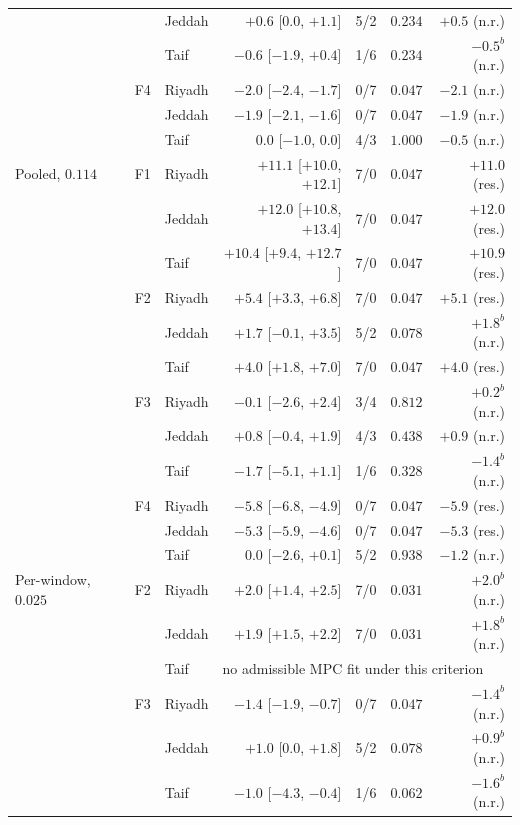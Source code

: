 \documentclass[11pt]{article}
\begin{document}
\begin{table}[!ht]
\begin{tabularx}{\textwidth}{@{}llXrrrr@{}}
 &  & Jeddah & $+0.6$ [$0.0$, $+1.1$] & 5/2 & $0.234$ & $+0.5$ (n.r.) \\
 &  & Taif & $-0.6$ [$-1.9$, $+0.4$] & 1/6 & $0.234$ & $-0.5^{b}$ (n.r.) \\
 & F4 & Riyadh & $-2.0$ [$-2.4$, $-1.7$] & 0/7 & $0.047$ & $-2.1$ (n.r.) \\
 &  & Jeddah & $-1.9$ [$-2.1$, $-1.6$] & 0/7 & $0.047$ & $-1.9$ (n.r.) \\
 &  & Taif & $0.0$ [$-1.0$, $0.0$] & 4/3 & $1.000$ & $-0.5$ (n.r.) \\
Pooled, $0.114$ & F1 & Riyadh & $+11.1$ [$+10.0$, $+12.1$] & 7/0 & $0.047$ & $+11.0$ (res.) \\
 &  & Jeddah & $+12.0$ [$+10.8$, $+13.4$] & 7/0 & $0.047$ & $+12.0$ (res.) \\
 &  & Taif & $+10.4$ [$+9.4$, $+12.7$] & 7/0 & $0.047$ & $+10.9$ (res.) \\
 & F2 & Riyadh & $+5.4$ [$+3.3$, $+6.8$] & 7/0 & $0.047$ & $+5.1$ (res.) \\
 &  & Jeddah & $+1.7$ [$-0.1$, $+3.5$] & 5/2 & $0.078$ & $+1.8^{b}$ (n.r.) \\
 &  & Taif & $+4.0$ [$+1.8$, $+7.0$] & 7/0 & $0.047$ & $+4.0$ (res.) \\
 & F3 & Riyadh & $-0.1$ [$-2.6$, $+2.4$] & 3/4 & $0.812$ & $+0.2^{b}$ (n.r.) \\
 &  & Jeddah & $+0.8$ [$-0.4$, $+1.9$] & 4/3 & $0.438$ & $+0.9$ (n.r.) \\
 &  & Taif & $-1.7$ [$-5.1$, $+1.1$] & 1/6 & $0.328$ & $-1.4^{b}$ (n.r.) \\
 & F4 & Riyadh & $-5.8$ [$-6.8$, $-4.9$] & 0/7 & $0.047$ & $-5.9$ (res.) \\
 &  & Jeddah & $-5.3$ [$-5.9$, $-4.6$] & 0/7 & $0.047$ & $-5.3$ (res.) \\
 &  & Taif & $0.0$ [$-2.6$, $+0.1$] & 5/2 & $0.938$ & $-1.2$ (n.r.) \\
Per-window, $0.025$ & F2 & Riyadh & $+2.0$ [$+1.4$, $+2.5$] & 7/0 & $0.031$ & $+2.0^{b}$ (n.r.) \\
 &  & Jeddah & $+1.9$ [$+1.5$, $+2.2$] & 7/0 & $0.031$ & $+1.8^{b}$ (n.r.) \\
 &  & Taif & \multicolumn{4}{l}{no admissible MPC fit under this criterion} \\
 & F3 & Riyadh & $-1.4$ [$-1.9$, $-0.7$] & 0/7 & $0.047$ & $-1.4^{b}$ (n.r.) \\
 &  & Jeddah & $+1.0$ [$0.0$, $+1.8$] & 5/2 & $0.078$ & $+0.9^{b}$ (n.r.) \\
 &  & Taif & $-1.0$ [$-4.3$, $-0.4$] & 1/6 & $0.062$ & $-1.6^{b}$ (n.r.) \\

\end{tabularx}
\end{table}
\end{document}
